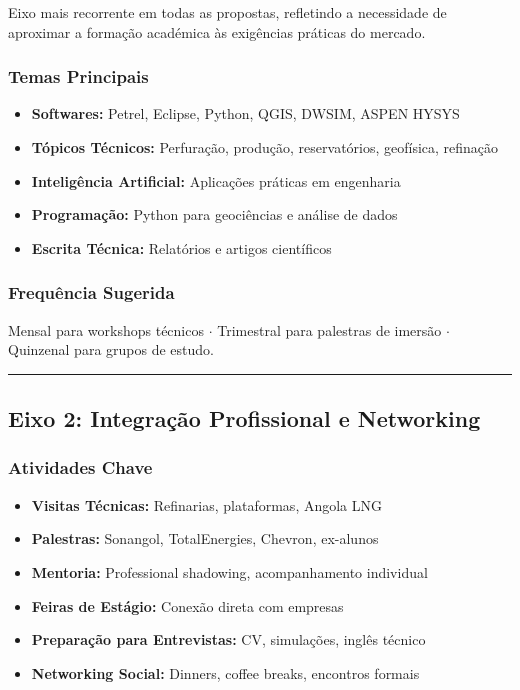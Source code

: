 \documentclass[12pt,a4paper]{article}
\newcommand{\proposalsep}{%
  \vspace{6pt}%
  {\color{gold}\rule{0.35\linewidth}{0.7pt}}%
  \vspace{4pt}%
}
\begin{document}
Eixo mais recorrente em todas as propostas, refletindo a necessidade de aproximar a formação académica às exigências práticas do mercado.

\subsubsection*{Temas Principais}
\begin{itemize}
    \item \textbf{Softwares:} Petrel, Eclipse, Python, QGIS, DWSIM, ASPEN HYSYS
    \item \textbf{Tópicos Técnicos:} Perfuração, produção, reservatórios, geofísica, refinação
    \item \textbf{Inteligência Artificial:} Aplicações práticas em engenharia
    \item \textbf{Programação:} Python para geociências e análise de dados
    \item \textbf{Escrita Técnica:} Relatórios e artigos científicos
\end{itemize}

\subsubsection*{Frequência Sugerida}
Mensal para workshops técnicos $\cdot$ Trimestral para palestras de imersão $\cdot$ Quinzenal para grupos de estudo.

\proposalsep

\subsection{Eixo 2: Integração Profissional e Networking}

\subsubsection*{Atividades Chave}
\begin{itemize}
    \item \textbf{Visitas Técnicas:} Refinarias, plataformas, Angola LNG
    \item \textbf{Palestras:} Sonangol, TotalEnergies, Chevron, ex-alunos
    \item \textbf{Mentoria:} Professional shadowing, acompanhamento individual
    \item \textbf{Feiras de Estágio:} Conexão direta com empresas
    \item \textbf{Preparação para Entrevistas:} CV, simulações, inglês técnico
    \item \textbf{Networking Social:} Dinners, coffee breaks, encontros formais
\end{itemize}
\end{document}
